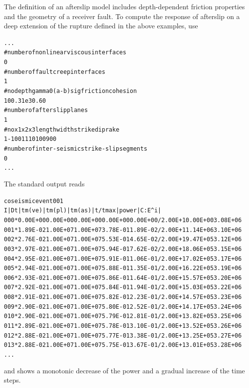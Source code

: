 \documentclass[10pt]{article}
\begin{document}
The definition of an afterslip model includes depth-dependent friction properties and the geometry of a receiver fault. To compute the response of afterslip on a deep extension of the rupture defined in the above examples, use
\begin{alltt}
...
# number of nonlinear viscous interfaces
0
# number of fault creep interfaces
{\color{orange}1}
# no depth   gamma0 (a-b)sig friction cohesion
{\color{orange}   1     0      0.3      1e3      0.6        0}
# number of afterslip planes
{\color{orange}1}
# no  x1 x2 x3 length width strike  dip rake
{\color{orange}   1 -10  0 11     10    10      0   90    0}
# number of inter-seismic strike-slip segments
0
...
\end{alltt}
The standard output reads
\begin{alltt}
coseismic event 001
 I  |   Dt   | tm(ve) | tm(pl) | tm(as) |     t/tmax     | power  |  C:E^i |
000* 0.00E+00 0.00E+00 0.00E+00 0.00E+00 0.00E+00/2.00E+1 0.00E+00 3.08E+06
001* {\color{NavyBlue}1.89E-02} 1.00E+07 1.00E+07 {\color{NavyBlue}3.78E-01} 1.89E-02/2.00E+1 {\color{NavyBlue}1.14E+06 3.10E+06}
002* {\color{NavyBlue}2.76E-02} 1.00E+07 1.00E+07 {\color{NavyBlue}5.53E-01} 4.65E-02/2.00E+1 {\color{NavyBlue}9.47E+05 3.12E+06}
003* {\color{NavyBlue}2.97E-02} 1.00E+07 1.00E+07 {\color{NavyBlue}5.94E-01} 7.62E-02/2.00E+1 {\color{NavyBlue}8.06E+05 3.15E+06}
004* {\color{NavyBlue}2.95E-02} 1.00E+07 1.00E+07 {\color{NavyBlue}5.91E-01} 1.06E-01/2.00E+1 {\color{NavyBlue}7.02E+05 3.17E+06}
005* {\color{NavyBlue}2.94E-02} 1.00E+07 1.00E+07 {\color{NavyBlue}5.88E-01} 1.35E-01/2.00E+1 {\color{NavyBlue}6.22E+05 3.19E+06}
006* {\color{NavyBlue}2.93E-02} 1.00E+07 1.00E+07 {\color{NavyBlue}5.86E-01} 1.64E-01/2.00E+1 {\color{NavyBlue}5.57E+05 3.20E+06}
007* {\color{NavyBlue}2.92E-02} 1.00E+07 1.00E+07 {\color{NavyBlue}5.84E-01} 1.94E-01/2.00E+1 {\color{NavyBlue}5.03E+05 3.22E+06}
008* {\color{NavyBlue}2.91E-02} 1.00E+07 1.00E+07 {\color{NavyBlue}5.82E-01} 2.23E-01/2.00E+1 {\color{NavyBlue}4.57E+05 3.23E+06}
009* {\color{NavyBlue}2.90E-02} 1.00E+07 1.00E+07 {\color{NavyBlue}5.80E-01} 2.52E-01/2.00E+1 {\color{NavyBlue}4.17E+05 3.24E+06}
010* {\color{NavyBlue}2.90E-02} 1.00E+07 1.00E+07 {\color{NavyBlue}5.79E-01} 2.81E-01/2.00E+1 {\color{NavyBlue}3.82E+05 3.25E+06}
011* {\color{NavyBlue}2.89E-02} 1.00E+07 1.00E+07 {\color{NavyBlue}5.78E-01} 3.10E-01/2.00E+1 {\color{NavyBlue}3.52E+05 3.26E+06}
012* {\color{NavyBlue}2.88E-02} 1.00E+07 1.00E+07 {\color{NavyBlue}5.77E-01} 3.38E-01/2.00E+1 {\color{NavyBlue}3.25E+05 3.27E+06}
013* {\color{NavyBlue}2.88E-02} 1.00E+07 1.00E+07 {\color{NavyBlue}5.75E-01} 3.67E-01/2.00E+1 {\color{NavyBlue}3.01E+05 3.28E+06}
...
\end{alltt}
and shows a monotonic decrease of the power and a gradual increase of the time steps.
\end{document}
